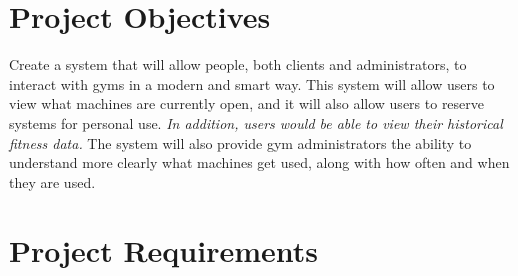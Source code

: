 \documentclass[letterpaper,11pt]{texMemo} %
\begin{document}
\maketitle

\section{Project Objectives}

Create a system that will allow people, both clients and administrators, to interact with gyms in a modern and smart way.
This system will allow users to view what machines are currently open, 
    and it will also allow users to reserve systems for personal use. 
\textit{In addition, users would be able to view their historical fitness data.}
The system will also provide gym administrators the ability to understand more clearly what machines get used,
    along with how often and when they are used.

\section{Project Requirements}
\end{document}

